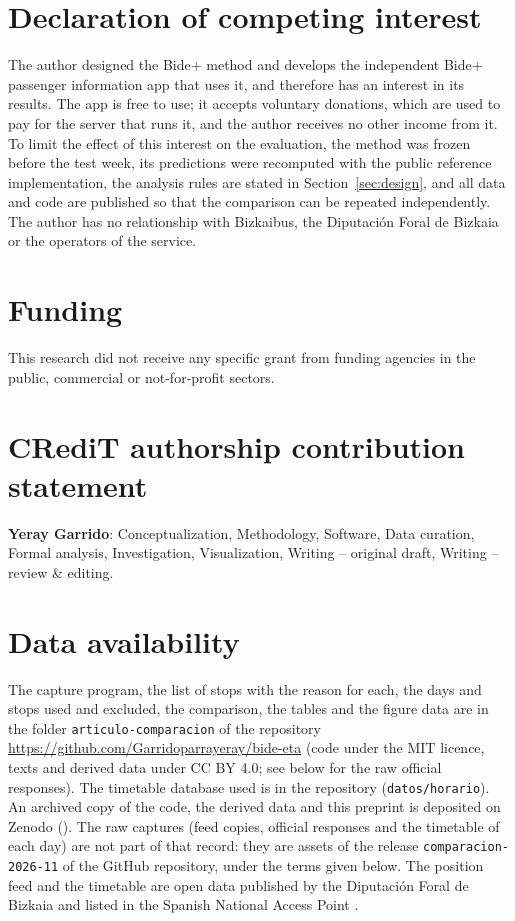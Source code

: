 \section*{Declaration of competing interest}

The author designed the Bide+ method and develops the independent Bide+ passenger information app that uses it, and
therefore has an interest in its results. The app is free to use; it accepts voluntary donations, which are used to pay
for the server that runs it, and the author receives no other income from it. To limit the effect of this interest on the evaluation, the method was frozen
before the test week, its predictions were recomputed with the public reference implementation, the analysis rules are
stated in Section~\ref{sec:design}, and all data and code are published so that the comparison can be repeated
independently. The author has no relationship with Bizkaibus, the Diputación Foral de Bizkaia or the operators of the
service.

\section*{Funding}

This research did not receive any specific grant from funding agencies in the public, commercial or not-for-profit
sectors.

\section*{CRediT authorship contribution statement}

\textbf{Yeray Garrido}: Conceptualization, Methodology, Software, Data curation, Formal analysis, Investigation,
Visualization, Writing -- original draft, Writing -- review \& editing.

\section*{Data availability}

The capture program, the list of stops with the reason for each, the days and stops used and excluded, the comparison,
the tables and the figure data are in the folder \texttt{articulo-comparacion} of the repository
\url{https://github.com/Garridoparrayeray/bide-eta} (code under the MIT licence, texts and derived data under CC BY 4.0; see below for the raw official responses).
The timetable database used is in the repository (\texttt{datos/horario}). An archived copy of the code, the derived data and this
preprint is deposited on Zenodo (\doidatos). The raw captures (feed copies, official responses and the timetable of
each day) are not part of that record: they are assets of the release \texttt{comparacion-2026-11} of the GitHub
repository, under the terms given below. The position feed and the timetable are open data published by the Diputación Foral de Bizkaia and listed in
the Spanish National Access Point \parencite{nap}.

